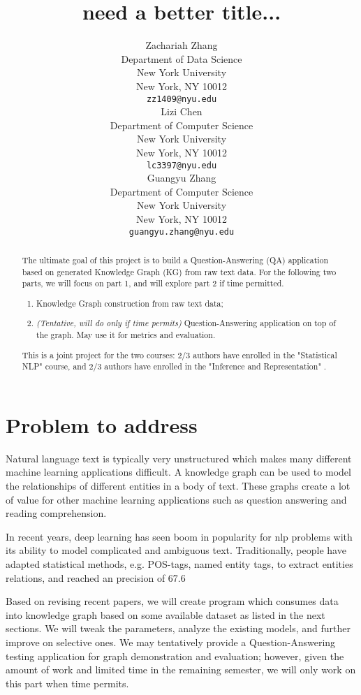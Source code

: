 \documentclass{article}
\title{need a better title...}
\author{
  Zachariah Zhang\\
  Department of Data Science\\
  New York University\\
  New York, NY 10012 \\
  \texttt{zz1409@nyu.edu} \\
  \And
  Lizi Chen\\
  Department of Computer Science\\
  New York University\\
  New York, NY 10012 \\
  \texttt{lc3397@nyu.edu} \\
  \And
  Guangyu Zhang\\
  Department of Computer Science\\
  New York University\\
  New York, NY 10012 \\
  \texttt{guangyu.zhang@nyu.edu} \\
}
\begin{document}

\maketitle

\begin{abstract}
	The ultimate goal of this project is to build a Question-Answering (QA) application based on generated Knowledge Graph (KG) from raw text data. For the following two parts, we will focus on part 1, and will explore part 2 if time permitted.
	 \begin{enumerate}
	 	\item Knowledge Graph construction from raw text data;
	 	\item \emph{(Tentative, will do only if time permits)} Question-Answering application on top of the graph. May use it for metrics and evaluation.
 	\end{enumerate}
 
	This is a joint project for the two courses: 2/3 authors have enrolled in the "Statistical NLP" course, and 2/3 authors have enrolled in the "Inference and Representation" .
\end{abstract}


\section{Problem to address}

	Natural language text is typically very unstructured which makes many different machine learning applications difficult. A knowledge graph can be used to model the relationships of different entities in a body of text. These graphs create a lot of value for other machine learning applications such as question answering and reading comprehension. 
	
	In recent years, deep learning has seen boom in popularity for nlp problems with its ability to model complicated and ambiguous text. Traditionally, people have adapted statistical methods, e.g. POS-tags, named entity tags, to extract entities relations, and reached an precision of 67.6%
	
	Based on revising recent papers, we will create program which consumes data into knowledge graph based on some available dataset as listed in the next sections. We will tweak the parameters, analyze the existing models, and further improve on selective ones. We may tentatively provide a Question-Answering testing application for graph demonstration and evaluation; however, given the amount of work and limited time in the remaining semester, we will only work on this part when time permits.
  
\end{document}
